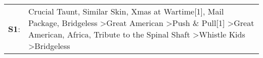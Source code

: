 \begin{supertabular}{p{0.03\textwidth}p{0.92\textwidth}}
 \textbf{S1}:  &  Crucial Taunt\textsuperscript{}, \enspace Similar Skin\textsuperscript{}, \enspace Xmas at Wartime[1]\textsuperscript{}, \enspace Mail Package\textsuperscript{}, \enspace Bridgeless\textsuperscript{} \textgreater \enspace Great American\textsuperscript{} \textgreater \enspace Push \& Pull[1]\textsuperscript{} \textgreater \enspace Great American\textsuperscript{}, \enspace Africa\textsuperscript{}, \enspace Tribute to the Spinal Shaft\textsuperscript{} \textgreater \enspace Whistle Kids\textsuperscript{} \textgreater \enspace Bridgeless\textsuperscript{}  \enspace  \\
\end{supertabular}

